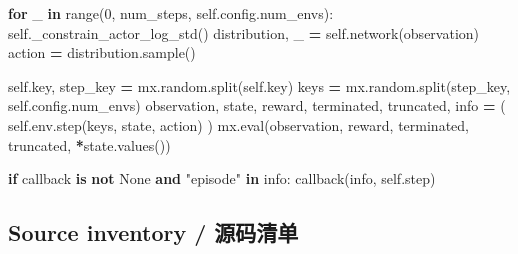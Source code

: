 \documentclass[
  american,
  11pt,
  letterpaper,
]{article}
\newenvironment{Shaded}{\begin{snugshade}}{\end{snugshade}}
\newcommand{\BuiltInTok}[1]{#1}
\newcommand{\ControlFlowTok}[1]{\textcolor[rgb]{0.13,0.29,0.53}{\textbf{#1}}}
\newcommand{\DecValTok}[1]{\textcolor[rgb]{0.00,0.00,0.81}{#1}}
\newcommand{\KeywordTok}[1]{\textcolor[rgb]{0.13,0.29,0.53}{\textbf{#1}}}
\newcommand{\NormalTok}[1]{#1}
\newcommand{\OperatorTok}[1]{\textcolor[rgb]{0.81,0.36,0.00}{\textbf{#1}}}
\newcommand{\StringTok}[1]{\textcolor[rgb]{0.31,0.60,0.02}{#1}}
\newcommand{\VariableTok}[1]{\textcolor[rgb]{0.00,0.00,0.00}{#1}}
\renewenvironment{Shaded}{\par\smallskip}{\par\smallskip}
\begin{document}
\begin{Shaded}
\begin{Highlighting}[]
        \ControlFlowTok{for}\NormalTok{ \_ }\KeywordTok{in} \BuiltInTok{range}\NormalTok{(}\DecValTok{0}\NormalTok{, num\_steps, }\VariableTok{self}\NormalTok{.config.num\_envs):}
            \VariableTok{self}\NormalTok{.\_constrain\_actor\_log\_std()}
\NormalTok{            distribution, \_ }\OperatorTok{=} \VariableTok{self}\NormalTok{.network(observation)}
\NormalTok{            action }\OperatorTok{=}\NormalTok{ distribution.sample()}

            \VariableTok{self}\NormalTok{.key, step\_key }\OperatorTok{=}\NormalTok{ mx.random.split(}\VariableTok{self}\NormalTok{.key)}
\NormalTok{            keys }\OperatorTok{=}\NormalTok{ mx.random.split(step\_key, }\VariableTok{self}\NormalTok{.config.num\_envs)}
\NormalTok{            observation, state, reward, terminated, truncated, info }\OperatorTok{=}\NormalTok{ (}
                \VariableTok{self}\NormalTok{.env.step(keys, state, action)}
\NormalTok{            )}
\NormalTok{            mx.}\BuiltInTok{eval}\NormalTok{(observation, reward, terminated, truncated, }\OperatorTok{*}\NormalTok{state.values())}

            \ControlFlowTok{if}\NormalTok{ callback }\KeywordTok{is} \KeywordTok{not} \VariableTok{None} \KeywordTok{and} \StringTok{"episode"} \KeywordTok{in}\NormalTok{ info:}
\NormalTok{                callback(info, }\VariableTok{self}\NormalTok{.step)}
\end{Highlighting}
\end{Shaded}

\subsection{Source inventory /
源码清单}\label{source-inventory-ux6e90ux7801ux6e05ux5355}
\end{document}
